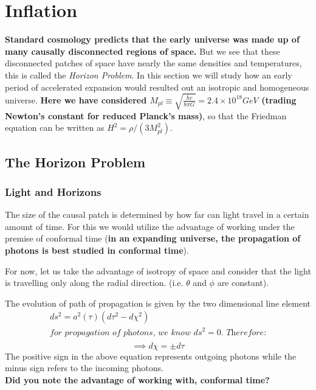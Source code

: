 \documentclass[12pt]{report}
\newcommand{\tbf}[1]{\textbf{#1}}
\newcommand{\tit}[1]{\textit{#1}}
\begin{document}
\chapter{Inflation}
\tbf{Standard cosmology predicts that the early universe was made up of many causally disconnected regions of space.} But we see that these disconnected patches of space have nearly the same densities and temperatures, this is called the \tit{Horizon Problem}. In this section we will study how an early period of accelerated expansion would resulted out an isotropic and homogeneous universe.
\tbf{Here we have considered $M_{pl} \equiv \sqrt{\frac{\bar{h}c}{8 \pi G}}= 2.4 \times 10^{18} GeV$ (trading Newton's constant for reduced Planck's mass)}, so that the Friedman equation can be written as $H^2= \rho/ (3 M^2_{pl})$.
\section{The Horizon Problem}
\subsection{Light and Horizons}
The size of the causal patch is determined by how far can light travel in a certain amount of time. For this we would utilize the advantage of working under the premise of conformal time (\tbf{in an expanding universe, the propagation of photons is best studied in conformal time}). 

For now, let us take the advantage of isotropy of space and consider that the light is travelling only along the radial direction. (i.e. $\theta$ and $\phi$ are constant). 

The evolution of path of propagation is given by the two dimensional line element
\begin{eqnarray*}
ds^2= a^2(\tau) \left(d \tau^2 - d \chi^2\right)\\
\tit{for propagation of photons, we know $ds^2=0$. Therefore:}\\
\end{eqnarray*}
\begin{equation}\label{comoving distance}
\implies d \chi = \pm d \tau
\end{equation}
The positive sign in the above equation represents outgoing photons while the minus sign refers to the incoming photons. \\
\tbf{Did you note the advantage of working with, conformal time?}
\end{document}
